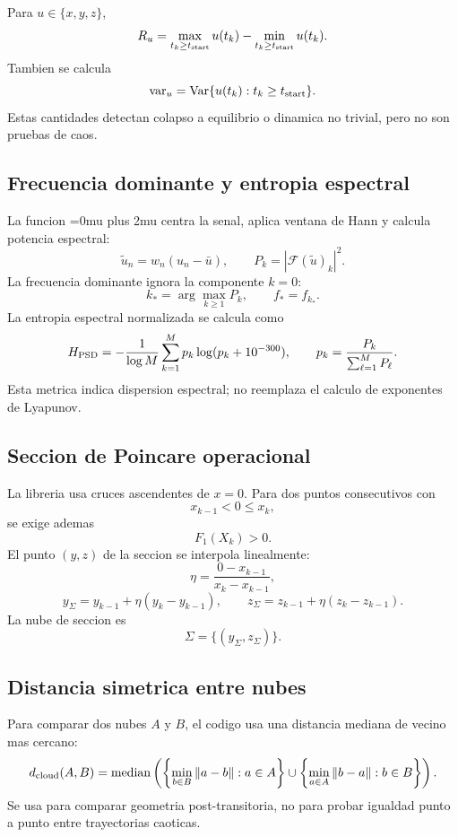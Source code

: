 \documentclass[11pt]{article}
\DeclareRobustCommand{\codepath}[1]{\begingroup\Urlmuskip=0mu plus 2mu\path{#1}\endgroup}
\newcommand{\med}{\operatorname{median}}
\begin{document}
Para \(u\in\{x,y,z\}\),
\begin{equation}
\label{eq:range_u}
R_u=\max_{t_k\geq t_{\rm start}} u(t_k)
-\min_{t_k\geq t_{\rm start}} u(t_k).
\end{equation}
Tambien se calcula
\[
\operatorname{var}_u
=
\operatorname{Var}\{u(t_k):t_k\geq t_{\rm start}\}.
\]
Estas cantidades detectan colapso a equilibrio o dinamica no trivial, pero no
son pruebas de caos.

\subsection{Frecuencia dominante y entropia espectral}

La funcion \codepath{component_fft} centra la senal, aplica ventana de Hann y
calcula potencia espectral:
\[
\tilde u_n=w_n(u_n-\bar u),
\qquad
P_k=|\mathcal F(\tilde u)_k|^2.
\]
La frecuencia dominante ignora la componente \(k=0\):
\[
k_\ast=\arg\max_{k\geq1}P_k,
\qquad
f_\ast=f_{k_\ast}.
\]
La entropia espectral normalizada se calcula como
\begin{equation}
\label{eq:spectral_entropy}
H_{\rm PSD}
=
-\frac{1}{\log M}
\sum_{k=1}^{M}p_k\log(p_k+10^{-300}),
\qquad
p_k=\frac{P_k}{\sum_{\ell=1}^{M}P_\ell}.
\end{equation}
Esta metrica indica dispersion espectral; no reemplaza el calculo de exponentes
de Lyapunov.

\subsection{Seccion de Poincare operacional}

La libreria usa cruces ascendentes de \(x=0\). Para dos puntos consecutivos con
\[
x_{k-1}<0\leq x_k,
\]
se exige ademas
\[
F_1(X_k)>0.
\]
El punto \((y,z)\) de la seccion se interpola linealmente:
\[
\eta=\frac{0-x_{k-1}}{x_k-x_{k-1}},
\]
\[
y_\Sigma=y_{k-1}+\eta(y_k-y_{k-1}),
\qquad
z_\Sigma=z_{k-1}+\eta(z_k-z_{k-1}).
\]
La nube de seccion es
\[
\Sigma=\{(y_\Sigma,z_\Sigma)\}.
\]

\subsection{Distancia simetrica entre nubes}

Para comparar dos nubes \(A\) y \(B\), el codigo usa una distancia mediana de
vecino mas cercano:
\begin{equation}
\label{eq:cloud_median_distance}
d_{\rm cloud}(A,B)
=
\med\left(
\left\{
\min_{b\in B}\|a-b\|:a\in A
\right\}
\cup
\left\{
\min_{a\in A}\|b-a\|:b\in B
\right\}
\right).
\end{equation}
Se usa para comparar geometria post-transitoria, no para probar igualdad
punto a punto entre trayectorias caoticas.
\end{document}
